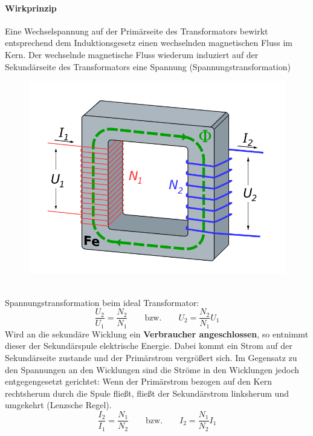 				\paragraph*{Wirkprinzip}
					Eine Wechselspannung auf der Primärseite des Transformators bewirkt entsprechend dem Induktionsgesetz einen wechselnden magnetischen Fluss im Kern. Der wechselnde magnetische Fluss wiederum induziert auf der Sekundärseite des Transformators eine Spannung (Spannungstransformation)
					\begin{figure}[h]
					\centering
					\includegraphics[width=0.4\linewidth]{./pics/el/trafo}
				\end{figure}\\
					Spannungstransformation beim ideal Transformator:\\
					\[\dfrac{U_{2}}{U_{1}}=\dfrac{N_{2}}{N_{1}} \qquad \text{bzw.} \qquad U_{2}=\dfrac{N_{2}}{N_{1}}U_{1}\]
					Wird an die sekundäre Wicklung ein \textbf{Verbraucher angeschlossen}, so entnimmt dieser der Sekundärspule elektrische Energie. Dabei kommt ein Strom auf der Sekundärseite zustande und der Primärstrom vergrößert sich. Im Gegensatz zu den Spannungen an den Wicklungen sind die Ströme in den Wicklungen jedoch entgegengesetzt gerichtet: Wenn der Primärstrom bezogen auf den Kern rechtsherum durch die Spule fließt, fließt der Sekundärstrom linksherum und umgekehrt (Lenzsche Regel).
					\[\dfrac{I_{2}}{I_{1}}=\frac{N_{1}}{N_{2}}\qquad \text{bzw.} \qquad I_{2}=\frac{N_{1}}{N_{2}}I_{1}\]
